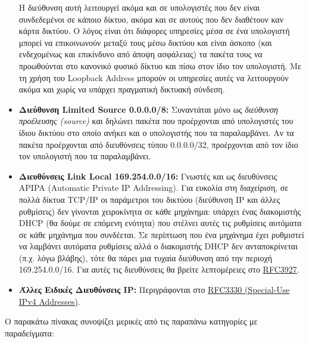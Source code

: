 \begin{itemize}
Η διεύθυνση αυτή λειτουργεί ακόμα και σε υπολογιστές που δεν είναι συνδεδεμένοι σε κάποιο δίκτυο, ακόμα και σε αυτούς που δεν διαθέτουν καν κάρτα δικτύου. Ο λόγος είναι ότι διάφορες υπηρεσίες μέσα σε ένα υπολογιστή μπορεί να επικοινωνούν μεταξύ τους μέσω δικτύου και είναι άσκοπο (και ενδεχομένως και επικίνδυνο από άποψη ασφάλειας) τα πακέτα τους να προωθούνται στο κανονικό φυσικό δίκτυο και πίσω στον ίδιο τον υπολογιστή. Με τη χρήση του Loopback Address μπορούν οι υπηρεσίες αυτές να λειτουργούν ακόμα και χωρίς να υπάρχει πραγματική δικτυακή σύνδεση.

\item \textbf{Διεύθυνση Limited Source 0.0.0.0/8:} Συναντάται μόνο ως \emph{διεύθυνση προέλευσης (source)} και δηλώνει πακέτα που προέρχονται από υπολογιστές του ίδιου δικτύου στο οποίο ανήκει και ο υπολογιστής που τα παραλαμβάνει. Αν τα πακέτα προέρχονται από διευθύνσεις τύπου 0.0.0.0/32, προέρχονται από τον ίδιο τον υπολογιστή που τα παραλαμβάνει.

\item \textbf{Διευθύνσεις Link Local 169.254.0.0/16:} Γνωστές και ως διευθύνσεις APIPA (Automatic Private IP Addressing). Για ευκολία στη διαχείριση, σε πολλά δίκτυα TCP/IP οι παράμετροι του δικτύου (διεύθυνση IP και άλλες ρυθμίσεις) δεν γίνονται χειροκίνητα σε κάθε μηχάνημα: υπάρχει ένας διακομιστής DHCP (θα δούμε σε επόμενη ενότητα) που στέλνει αυτές τις ρυθμίσεις αυτόματα σε κάθε μηχάνημα που συνδέεται. Σε περίπτωση που ένα μηχάνημα έχει ρυθμιστεί να λαμβάνει αυτόματα ρυθμίσεις αλλά ο διακομιστής DHCP δεν ανταποκρίνεται (π.χ. λόγω βλάβης), τότε θα πάρει μια τυχαία διεύθυνση από την περιοχή 169.254.0.0/16. Για αυτές τις διευθύνσεις θα βρείτε λεπτομέρειες στο \href{https://tools.ietf.org/html/rfc3927}{RFC3927}.
\item \textbf{Άλλες Ειδικές Διευθύνσεις IP:} Περιγράφονται στο \href{https://tools.ietf.org/html/rfc3330}{RFC3330 (Special-Use IPv4 Addresses)}.
\end{itemize}

Ο παρακάτω πίνακας συνοψίζει μερικές από τις παραπάνω κατηγορίες με παραδείγματα:

